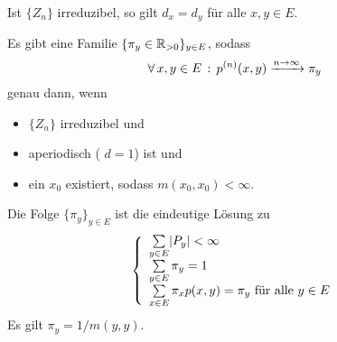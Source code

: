 \documentclass{cheat-sheet}
\begin{document}
\begin{lem}
  Ist $\{ Z_n \}$ irreduzibel, so gilt $d_x = d_y$ für alle $x, y \in E$.
\end{lem}

\begin{satz}
  Es gibt eine Familie $\{ \pi_y \in \mathbb{R}_{> 0} \}_{y \in E}$, sodass
  \[ \forall \, {x, y \in E} \,:\, p^{(n)}(x, y) \xrightarrow{n \to \infty} \pi_y \]
  genau dann, wenn
  \begin{itemize}
    \item $\{ Z_n \}$ irreduzibel und
    \item aperiodisch (\dh{} $d = 1$) ist und 
    \item ein $x_0$ existiert, sodass $m(x_0, x_0) < \infty$.
  \end{itemize}
  Die Folge $\{ \pi_y \}_{y \in E}$ ist die eindeutige Lösung zu
  \[
    \left\{
      \begin{array}{l}
        \sum_{y \in E} \abs{P_y} < \infty \\
        \sum_{y \in E} \pi_y = 1 \\
        \sum_{x \in E} \pi_x p(x, y) = \pi_y \text{ für alle } y \in E
      \end{array}
    \right.
  \]
  Es gilt $\pi_y = 1/m(y,y)$.
\end{satz}
\end{document}
